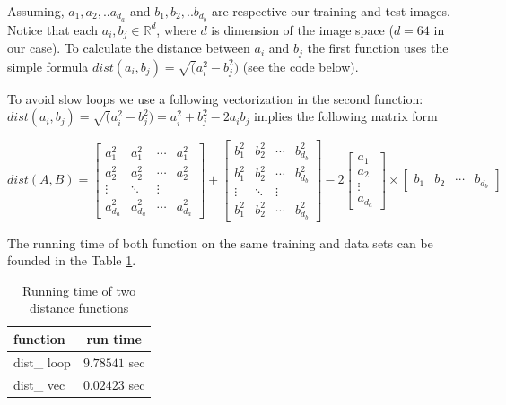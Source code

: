 \documentclass{article}
\begin{document}
Assuming, $a_1,a_2,..a_{d_a}$ and $b_1,b_2,..b_{d_b}$ are respective our training and test images. Notice that each $a_i, b_j \in \mathbb{R}^{d}$, where $d$ is dimension  of the image space ($d=64$ in our case). To calculate the distance between $a_i$ and $b_j$ the first function uses the simple formula $dist(a_i,b_j) = \sqrt(a_i^2 - b_j^2)$ (see the code below).




To avoid slow loops we use a following vectorization in the second function:
\vspace*{12pt}
$dist(a_i,b_j) = \sqrt(a_i^2 - b_j^2) = a_i^2+b_j^2-2a_ib_j$ implies the following matrix form

$
dist(A,B) = 
\begin{bmatrix} 
	a_1^2 & a_1^2 & \cdots & a_1^2 \\
	a_2^2 & a_2^2 & \cdots & a_2^2 \\
	\vdots & \ddots & \vdots \\
	a_{d_a}^2 & a_{d_a}^2 & \cdots & a_{d_a}^2
\end{bmatrix}
+
\begin{bmatrix} 
	b_1^2 & b_2^2 & \cdots & b_{d_b}^2 \\
	b_1^2 & b_2^2 & \cdots & b_{d_b}^2 \\
	\vdots & \ddots & \vdots \\
	b_1^2 & b_2^2 & \cdots & b_{d_b}^2
\end{bmatrix}
-2
\left[ 
\begin{array}{c}
	 a_1\\ a_2 \\ \vdots \\ a_{d_a} \end{array} \right]
	 \times
	 \left[ \begin{array}{cccc} b_1 & b_2 & \cdots & b_{d_b} \end{array} \right] 
$

\vspace*{12pt}

\vspace*{12pt}
The running time of both function on the same training and data sets can be founded in the Table \ref{Tab1}.

\begin{table}[htb]
	\centering
	\begin{tabular}{|l | c|}
		\hline
		function & run time \\ \hline
		dist\_ loop & $9.78541$ sec \\ 
		dist\_ vec &  $0.02423$ sec\\ \hline 
	\end{tabular}
\caption{Running time of two distance functions}
\label{Tab1}
\end{table}
\end{document}
